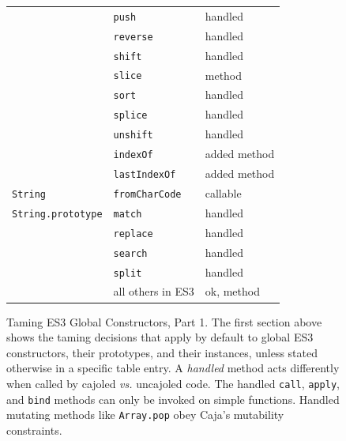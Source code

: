 \documentclass[letterpaper,twocolumn,10pt]{article}
\newcommand{\code}[1]{{\tt {#1}}}              %
\begin{document}
\begin{figure}
\begin{tabular}{lll}
                               & \code{push}                 & handled \\
                               & \code{reverse}              & handled \\
                               & \code{shift}                & handled \\
                               & \code{slice}                & method \\
                               & \code{sort}                 & handled \\
                               & \code{splice}               & handled \\
                               & \code{unshift}              & handled \\
                               & \code{indexOf}              & added method \\
                               & \code{lastIndexOf}          & added method \\
  \hline
  \code{String}                & \code{fromCharCode}         & callable \\
  \code{String.prototype}      & \code{match}                & handled \\
                               & \code{replace}              & handled \\
                               & \code{search}               & handled \\
                               & \code{split}                & handled \\
                               &           all others in ES3 & ok, method \\
\end{tabular}

\caption[Taming ES3 Global Constructors, Part 1.]{Taming ES3 Global 
Constructors, Part 1. The first section above shows the taming decisions that 
apply by default to global ES3 constructors, their prototypes, and their 
instances, unless stated otherwise in a specific table entry. A
\emph{handled} method acts differently when called by cajoled \emph{vs.} 
uncajoled code. The handled \code{call}, \code{apply}, and \code{bind} 
methods can only be invoked on simple functions. Handled mutating methods 
like \code{Array.pop} obey Caja's mutability constraints.}
\label{tab:taming-es3-1}
\end{figure}
\end{document}
